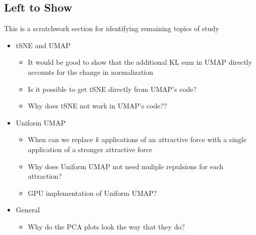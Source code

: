 \documentclass{article}
\theoremstyle{definition}
\begin{document}
\begin{multicols}{2}
\section{Left to Show}
This is a scratchwork section for identifying remaining topics of study
\begin{itemize}
    \item tSNE and UMAP
        \begin{itemize}
            \item It would be good to show that the additional KL sum in UMAP directly accounts for the change in normalization
            \item Is it possible to get tSNE directly from UMAP's code?
            \item Why does tSNE not work in UMAP's code??
        \end{itemize}
    \item Uniform UMAP
        \begin{itemize}
            \item When can we replace $k$ applications of an attractive force with a single application of a stronger attractive force
            \item Why does Uniform UMAP not need muliple repulsions for each attraction?
            \item GPU implementation of Uniform UMAP?
        \end{itemize}
    \item General
        \begin{itemize}
            \item Why do the PCA plots look the way that they do?
        \end{itemize}
\end{itemize}

\end{multicols}
\printbibliography
\end{document}
